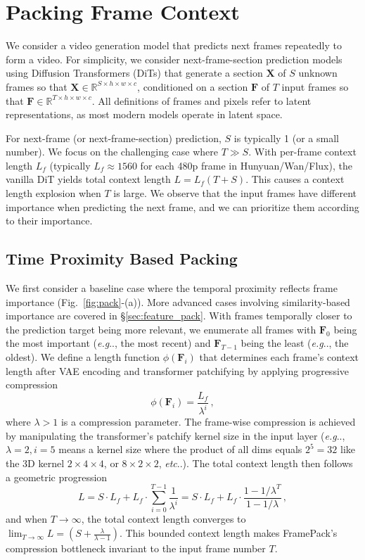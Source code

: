 \documentclass{article}
\makeatletter
\DeclareRobustCommand\onedot{\futurelet\@let@token\@onedot}
\def\@onedot{\ifx\@let@token.\else.\null\fi\xspace}
\def\eg{\emph{e.g}\onedot}
\def\etc{\emph{etc}\onedot}
\makeatother
\begin{document}
\section{Packing Frame Context}

We consider a video generation model that predicts next frames repeatedly to form a video. For simplicity, we consider next-frame-section prediction models using Diffusion Transformers (DiTs) that generate a section $\bm{X}$ of $S$ unknown frames so that $\bm{X}\in\mathbb{R}^{S\times h\times w\times c}$, conditioned on a section $\bm{F}$ of $T$ input frames so that $\bm{F}\in\mathbb{R}^{T\times h\times w\times c}$. All definitions of frames and pixels refer to latent representations, as most modern models operate in latent space.

For next-frame (or next-frame-section) prediction, $S$ is typically 1 (or a small number). We focus on the challenging case where $T \gg S$. With per-frame context length $L_f$ (typically $L_f\approx1560$ for each 480p frame in Hunyuan/Wan/Flux), the vanilla DiT yields total context length $L = L_f(T + S)$. This causes a context length explosion when $T$ is large. We observe that the input frames have different importance when predicting the next frame, and we can prioritize them according to their importance.

\subsection{Time Proximity Based Packing}

\label{sec:time_pack}

We first consider a baseline case where the temporal proximity reflects frame importance (Fig.~\ref{fig:pack}-(a)). More advanced cases involving similarity-based importance are covered in \S\ref{sec:feature_pack}. With frames temporally closer to the prediction target being more relevant, we enumerate all frames with $\bm{F}_0$ being the most important (\eg, the most recent) and $\bm{F}_{T-1}$ being the least (\eg, the oldest). We define a length function $\phi(\bm{F}_i)$ that determines each frame's context length after VAE encoding and transformer patchifying by applying progressive compression
\begin{equation}
\phi(\bm{F}_i) = \frac{L_f}{\lambda^i}\,,
\end{equation}
where $\lambda > 1$ is a compression parameter. The frame-wise compression is achieved by manipulating the transformer's patchify kernel size in the input layer (\eg, $\lambda=2, i=5$ means a kernel size where the product of all dims equals $2^5=32$ like the 3D kernel $2 \times 4 \times 4$, or $8 \times 2 \times 2$, \etc). The total context length then follows a geometric progression
\begin{equation}
L = S \cdot L_f + L_f \cdot \sum_{i=0}^{T-1} \frac{1}{\lambda^i} = S \cdot L_f + L_f \cdot \frac{1 - 1/\lambda^{T}}{1 - 1/\lambda}\,,
\end{equation}
and when $T \to \infty$, the total context length converges to $\lim_{T \to \infty} L = (S + \frac{\lambda}{\lambda-1})$. This bounded context length makes FramePack's compression bottleneck invariant to the input frame number $T$.
\end{document}
